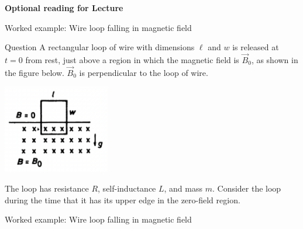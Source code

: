
\begin{frame}[plain,c]
\begin{center}
{\Huge \bf Optional reading for Lecture \thislecture}
\end{center}
\end{frame}


%
%

{
\problemslide

%
%
%

\begin{frame}{Worked example: Wire loop falling in magnetic field}

  \begin{blockexmplque}{Question}
    A rectangular loop of wire with dimensions $\ell$ and $w$ is released at
    $t=0$ from rest, just above a region in which the magnetic field is
    $\vec{B}_0$, as shown in the figure below.
    $\vec{B}_0$ is perpendicular to the loop of wire.
    \begin{center}
         \includegraphics[width=0.35\textwidth]{./images/problems/lect11_wire_loop_falling_in_b_field}
     \end{center}
    The loop has resistance $R$, self-inductance $L$, and mass $m$.
    Consider the loop during the time that it has its upper edge
    in the zero-field region.\\
  \end{blockexmplque}

\end{frame}

%
%
%

\begin{frame}{Worked example: Wire loop falling in magnetic field}


\end{frame}}
